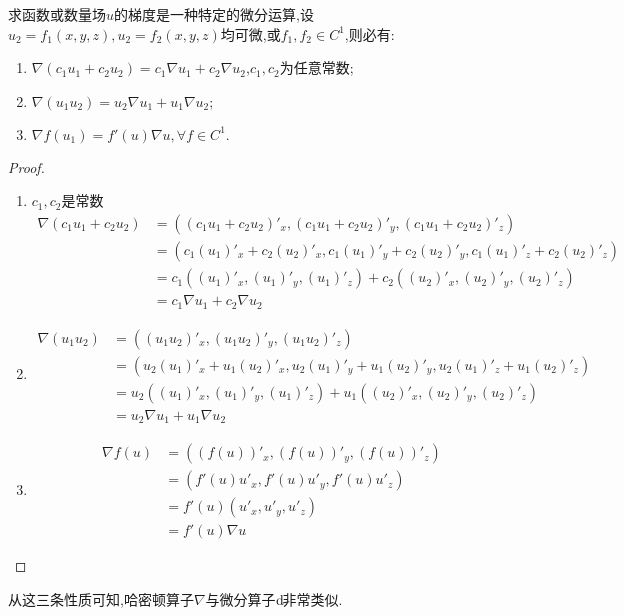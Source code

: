 \begin{proposition}
    求函数或数量场$u$的梯度是一种特定的微分运算,设$u_2=f_1(x,y,z),u_2=f_2(x,y,z)$均可微,或$f_1,f_2\in C^1$,则必有:
    \begin{enumerate}
        \item $\nabla (c_1u_1+c_2u_2)=c_1\nabla u_1+c_2\nabla u_2$,$c_1,c_2$为任意常数;
        \item $\nabla (u_1 u_2)=u_2\nabla u_1+u_1\nabla u_2;$
        \item $\nabla f(u_1)=f'(u)\nabla u,\forall f \in C^1.$
    \end{enumerate}
\end{proposition}
\begin{proof}
    \begin{enumerate}
        \item $c_1,c_2$是常数\begin{align*}
            \nabla (c_1u_1+c_2u_2)
            &=\left((c_1u_1+c_2u_2)'_x,(c_1u_1+c_2u_2)'_y,(c_1u_1+c_2u_2)'_z\right)\\
            &=\left(c_1(u_1)'_x+c_2(u_2)'_x,c_1(u_1)'_y+c_2(u_2)'_y,c_1(u_1)'_z+c_2(u_2)'_z\right)\\
            &=c_1\left((u_1)'_x,(u_1)'_y,(u_1)'_z\right)+c_2\left((u_2)'_x,(u_2)'_y,(u_2)'_z\right)\\
            &=c_1 \nabla u_1+c_2 \nabla u_2
        \end{align*}
        \item  \begin{align*}
            \nabla (u_1u_2)
            &=\left((u_1u_2)'_x,(u_1u_2)'_y,(u_1u_2)'_z\right)\\
            &=\left(u_2(u_1)'_x+u_1(u_2)'_x,u_2(u_1)'_y+u_1(u_2)'_y,u_2(u_1)'_z+u_1(u_2)'_z\right)\\
            &=u_2\left((u_1)'_x,(u_1)'_y,(u_1)'_z\right)+u_1\left((u_2)'_x,(u_2)'_y,(u_2)'_z\right)\\
            &=u_2 \nabla u_1+u_1 \nabla u_2
        \end{align*}
        \item \begin{align*}
            \nabla f(u)
            &=\left((f(u))'_x,(f(u))'_y,(f(u))'_z\right)\\
            &=\left(f'(u)u'_x,f'(u)u'_y,f'(u)u'_z\right)\\
            &=f'(u)\left(u'_x,u'_y,u'_z\right)\\
            &=f'(u)\nabla u
        \end{align*}
    \end{enumerate}
\end{proof}
从这三条性质可知,哈密顿算子$\nabla$与微分算子$\operatorname{d\!}$非常类似.

